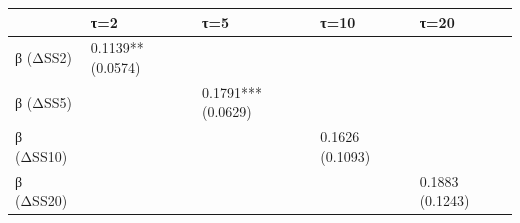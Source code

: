 \begin{tabular}{lllll}
\toprule
 & τ=2 & τ=5 & τ=10 & τ=20 \\
\midrule
β (ΔSS2) & 0.1139**
(0.0574) &  &  &  \\
β (ΔSS5) &  & 0.1791***
(0.0629) &  &  \\
β (ΔSS10) &  &  & 0.1626
(0.1093) &  \\
β (ΔSS20) &  &  &  & 0.1883
(0.1243) \\
\bottomrule
\end{tabular}
